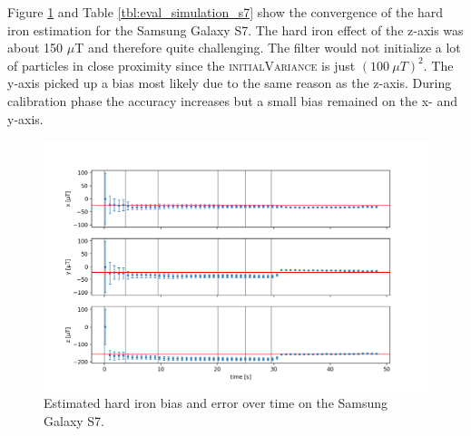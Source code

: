 Figure \ref{fig:eval_simulation_s7} and Table \ref{tbl:eval_simulation_s7} show the convergence of the hard iron estimation for the Samsung Galaxy S7. The hard iron effect of the z-axis was about 150 $\mu$T and therefore quite challenging. The filter would not initialize a lot of particles in close proximity since the \textsc{initialVariance} is just $(100\ \mu T)^2$. The y-axis picked up a bias most likely due to the same reason as the z-axis. During calibration phase the accuracy increases but a small bias remained on the x- and y-axis.

\begin{figure}[H]
    \centering
    \includegraphics[width=1.0\textwidth]{figures/convergence_s7.png}
    \caption{Estimated hard iron bias and error over time on the Samsung Galaxy S7.}
    \label{fig:eval_simulation_s7}
\end{figure}

